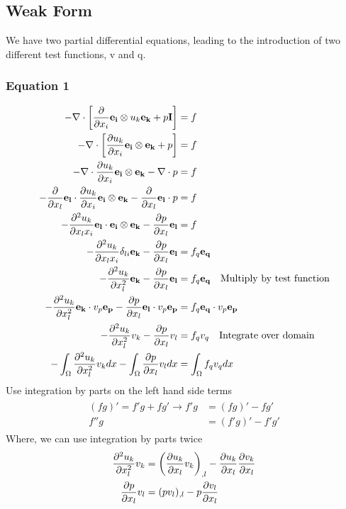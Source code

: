 \documentclass[12pt,3p]{article}
\begin{document}
\subsection{Weak Form}
We have two partial differential equations, leading to the introduction of two different test functions, v and q. 
\subsubsection{Equation 1} 
\begin{align*} 
- \nabla \cdot \bigg[ \pdv{}{x_i} \mathbf{e_i} \otimes u_k \mathbf{e_k} + p \mathbf{I} \bigg] &= f \\
- \nabla \cdot \bigg[ \pdv{u_k}{x_i} \mathbf{e_i} \otimes \mathbf{e_k} + p \bigg] &= f \\
- \nabla \cdot \pdv{u_k}{x_i} \mathbf{e_i} \otimes \mathbf{e_k} - \nabla \cdot p &= f \\
- \pdv{}{x_l} \mathbf{e_l} \cdot \pdv{u_k}{x_i} \mathbf{e_i} \otimes \mathbf{e_k} - \pdv{}{x_l} \mathbf{e_l} \cdot p &= f \\
- \pdv{^2 u_k}{x_l x_i} \mathbf{e_l} \cdot \mathbf{e_i} \otimes \mathbf{e_k} - \pdv{p}{x_l} \mathbf{e_l} &= f \\
- \pdv{^2 u_k}{x_l x_i} \delta_{li} \mathbf{e_k} - \pdv{p}{x_l} \mathbf{e_l} &= f _q \mathbf{e_q} \\
- \pdv[2]{u_k}{x_l} \mathbf{e_k} - \pdv{p}{x_l} \mathbf{e_l} &= f _q \mathbf{e_q} \quad \text{Multiply by test function} \\
- \pdv[2]{u_k}{x_l} \mathbf{e_k} \cdot v_p \mathbf{e_p} - \pdv{p}{x_l} \mathbf{e_l} \cdot v_p \mathbf{e_p} &= f _q \mathbf{e_q} \cdot v_p \mathbf{e_p} \\
- \pdv[2]{u_k}{x_l} v_k - \pdv{p}{x_l} v_l &= f _q v_q \quad \text{Integrate over domain} \\
- \int_{\Omega} \pdv[2]{u_k}{x_l} v_k dx - \int_{\Omega} \pdv{p}{x_l} v_l dx &= \int_{\Omega} f _q v_q dx 
\end{align*}
Use integration by parts on the left hand side terms 
\begin{align}\label{intParts}
\begin{split}
(fg)' = f'g + fg' \rightarrow f'g &= (fg)' - fg' \\
					f''g &= (f'g)' - f'g'
\end{split}
\end{align}
Where, we can use integration by parts twice 
\begin{align*}
\pdv[2]{u_k}{x_l} v_k &= \bigg(\pdv{u_k}{x_l} v_k \bigg)_{,l} - \pdv{u_k}{x_l} \pdv{v_k}{x_l} \\
\pdv{p}{x_l} v_l &= (p v_l)_{,l} - p \pdv{v_l}{x_l}
\end{align*}
\end{document}
